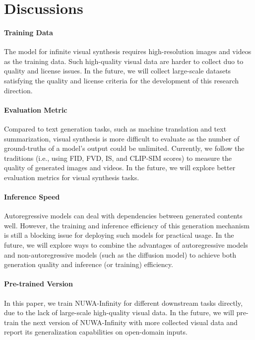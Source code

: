 \documentclass{article}
\begin{document}
\section{Discussions}

\paragraph{Training Data}
The model for infinite visual synthesis requires high-resolution images and videos as the training data. Such high-quality visual data are harder to collect duo to quality and license issues. In the future, we will collect large-scale datasets satisfying the quality and license criteria for the development of this research direction.

\paragraph{Evaluation Metric}
Compared to text generation tasks, such as machine translation and text summarization, visual synthesis is more difficult to evaluate as the number of ground-truths of a model's output could be unlimited. Currently, we follow the traditions (i.e., using FID, FVD, IS, and CLIP-SIM scores) to measure the quality of generated images and videos. In the future, we will explore better evaluation metrics for visual synthesis tasks.

\paragraph{Inference Speed} Autoregressive models can deal with dependencies between generated contents well. However, the training and inference efficiency of this generation mechanism is still a blocking issue for deploying such models for practical usage. In the future, we will explore ways to combine the advantages of autoregressive models and non-autoregressive models (such as the diffusion model) to achieve both generation quality and inference (or training) efficiency.

\paragraph{Pre-trained Version} In this paper, we train NUWA-Infinity for different downstream tasks directly, due to the lack of large-scale high-quality visual data. In the future, we will pre-train the next version of NUWA-Infinity with more collected visual data and report its generalization  capabilities on open-domain inputs. 
\end{document}
